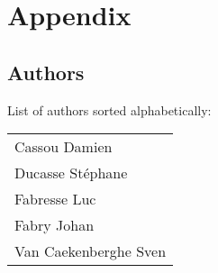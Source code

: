 \appendix

\part{Appendix}

\chapter{Authors}

List of authors sorted alphabetically:

\begin{tabular}{l}
Cassou Damien \\
Ducasse St\'ephane \\
Fabresse Luc    \\
Fabry Johan \\
Van Caekenberghe Sven\\
\end{tabular}

\backmatter



